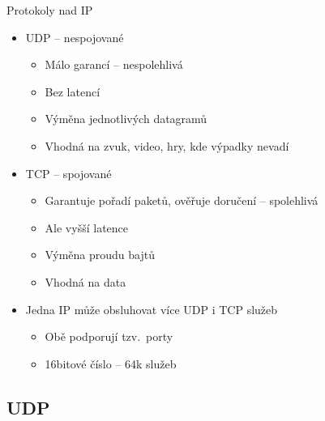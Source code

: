 \begin{frame}{Protokoly nad IP}

  \begin{itemize}
    \item UDP -- nespojované
    \begin{itemize}
      \item Málo garancí -- nespolehlivá
      \item Bez latencí

      \pause

      \item Výměna jednotlivých datagramů

      \pause

      \item Vhodná na zvuk, video, hry, kde výpadky nevadí
    \end{itemize}

    \pause

    \item TCP -- spojované
    \begin{itemize}
      \item Garantuje pořadí paketů, ověřuje doručení -- spolehlivá
      \item Ale vyšší latence

      \pause

      \item Výměna proudu bajtů

      \pause

      \item Vhodná na data
    \end{itemize}

    \pause

    \item Jedna IP může obsluhovat více UDP i TCP služeb
    \begin{itemize}
      \item Obě podporují tzv.\ porty
      \item 16bitové číslo -- 64k služeb
    \end{itemize}
  \end{itemize}

\end{frame}

\ifpcdirlinuxb

\subsection*{UDP}
\frame{\subsectionpage}

